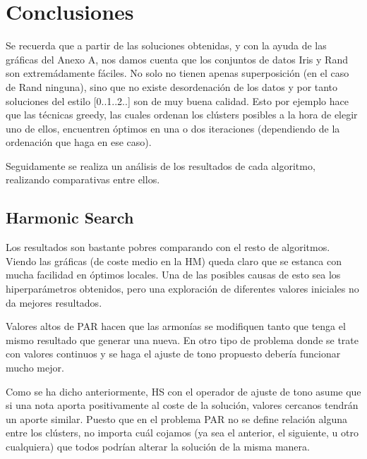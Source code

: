 \section{Conclusiones}

Se recuerda que a partir de las soluciones obtenidas, y con la ayuda de las gráficas del Anexo A, nos damos cuenta que los conjuntos de datos Iris y Rand son extremádamente fáciles. No solo no tienen apenas superposición (en el caso de Rand ninguna), sino que no existe desordenación de los datos y por tanto soluciones del estilo [0..1..2..] son de muy buena calidad. Esto por ejemplo hace que las técnicas greedy, las cuales ordenan los clústers posibles a la hora de elegir uno de ellos, encuentren óptimos en una o dos iteraciones (dependiendo de la ordenación que haga en ese caso).

\vspace{\baselineskip}

Seguidamente se realiza un análisis de los resultados de cada algoritmo, realizando comparativas entre ellos.

\subsection{Harmonic Search}

Los resultados son bastante pobres comparando con el resto de algoritmos. Viendo las gráficas (de coste medio en la HM) queda claro que se estanca con mucha facilidad en óptimos locales. Una de las posibles causas de esto sea los hiperparámetros obtenidos, pero una exploración de diferentes valores iniciales no da mejores resultados.

\vspace{\baselineskip}


Valores altos de PAR hacen que las armonías se modifiquen tanto que tenga el mismo resultado que generar una nueva. En otro tipo de problema donde se trate con valores continuos y se haga el ajuste de tono propuesto debería funcionar mucho mejor.

Como se ha dicho anteriormente, HS con el operador de ajuste de tono asume que si una nota aporta positivamente al coste de la solución, valores cercanos tendrán un aporte similar. Puesto que en el problema PAR no se define relación alguna entre los clústers, no importa cuál cojamos (ya sea el anterior, el siguiente, u otro cualquiera) que todos podrían alterar la solución de la misma manera.

